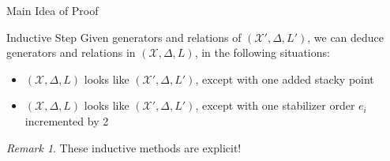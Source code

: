 \documentclass{beamer}
\theoremstyle{remark}
\newtheorem{rem}[thm]{Remark}
\newcommand \sx{{\mathscr X}}
\newcommand{\halfcan}{L}
\begin{document}
\begin{frame}{Main Idea of Proof}

\begin{block}{Inductive Step}
Given generators and relations of $(\sx', \Delta, \halfcan')$, we can deduce generators and relations in $(\sx, \Delta, \halfcan)$, in the following situations:
\begin{itemize}
\item $(\sx, \Delta, \halfcan)$ looks like $(\sx', \Delta, \halfcan')$, except with one added stacky point
\item $(\sx, \Delta, \halfcan)$ looks like $(\sx', \Delta, \halfcan')$, except with one stabilizer order $e_i$ incremented by 2
\end{itemize}
\end{block}

\begin{rem}
These inductive methods are explicit!
\end{rem}

\end{frame}
\end{document}
